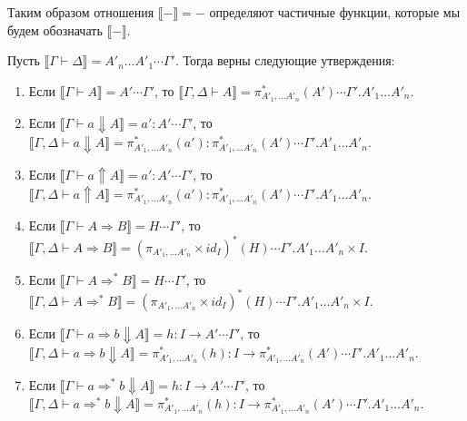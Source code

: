 \documentclass{amsart}
\theoremstyle{definition}
\theoremstyle{remark}
\newcommand{\red}{\Rightarrow}
\renewcommand{\ll}{\llbracket}
\newcommand{\rr}{\rrbracket}
\numberwithin{figure}{section}
\begin{document}
Таким образом отношения $\ll - \rr = -$ определяют частичные функции, которые мы будем обозначать $\ll - \rr$.

\begin{lem}
Пусть $\ll \Gamma \vdash \Delta\rr = A'_n \ldots A'_1 \dotsb \Gamma'$.
Тогда верны следующие утверждения:
\begin{enumerate}
\item Если $\ll \Gamma \vdash A \rr = A' \dotsb \Gamma'$, то $\ll \Gamma, \Delta \vdash A \rr = \pi_{A'_1, \ldots A'_n}^*(A') \dotsb \Gamma'.A'_1 \ldots A'_n$.
\item Если $\ll \Gamma \vdash a \Downarrow A \rr = a' : A' \dotsb \Gamma'$, то $\ll \Gamma, \Delta \vdash a \Downarrow A \rr = \pi_{A'_1, \ldots A'_n}^*(a') : \pi_{A'_1, \ldots A'_n}^*(A') \dotsb \Gamma'.A'_1 \ldots A'_n$.
\item Если $\ll \Gamma \vdash a \Uparrow A \rr = a' : A' \dotsb \Gamma'$, то $\ll \Gamma, \Delta \vdash a \Uparrow A \rr = \pi_{A'_1, \ldots A'_n}^*(a') : \pi_{A'_1, \ldots A'_n}^*(A') \dotsb \Gamma'.A'_1 \ldots A'_n$.
\item Если $\ll \Gamma \vdash A \red B \rr = H \dotsb \Gamma'$, то $\ll \Gamma, \Delta \vdash A \red B \rr = (\pi_{A'_1, \ldots A'_n} \times id_I)^*(H) \dotsb \Gamma'.A'_1 \ldots A'_n \times I$.
\item Если $\ll \Gamma \vdash A \red^* B \rr = H \dotsb \Gamma'$, то $\ll \Gamma, \Delta \vdash A \red^* B \rr = (\pi_{A'_1, \ldots A'_n} \times id_I)^*(H) \dotsb \Gamma'.A'_1 \ldots A'_n \times I$.
\item Если $\ll \Gamma \vdash a \red b \Downarrow A \rr = h : I \to A' \dotsb \Gamma'$, то $\ll \Gamma, \Delta \vdash a \red b \Downarrow A \rr = \pi_{A'_1, \ldots A'_n}^*(h) : I \to \pi_{A'_1, \ldots A'_n}^*(A') \dotsb \Gamma'.A'_1 \ldots A'_n$.
\item Если $\ll \Gamma \vdash a \red^* b \Downarrow A \rr = h : I \to A' \dotsb \Gamma'$, то $\ll \Gamma, \Delta \vdash a \red^* b \Downarrow A \rr = \pi_{A'_1, \ldots A'_n}^*(h) : I \to \pi_{A'_1, \ldots A'_n}^*(A') \dotsb \Gamma'.A'_1 \ldots A'_n$.
\end{enumerate}
\end{lem}
\end{document}
